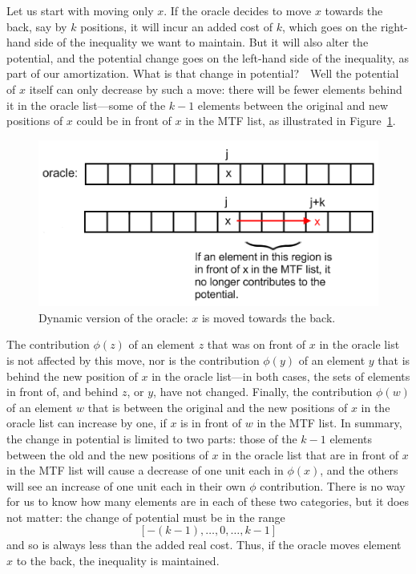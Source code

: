 \documentclass{article}
\begin{document}
Let us start with moving only $x$.  If the oracle decides to move $x$
towards the back, say by $k$ positions, it will incur an added cost of $k$,
which goes on the right-hand side of the inequality we want to maintain.
But it will also alter the potential, and the potential change goes on
the left-hand side of the inequality, as part of our amortization.
What is that change in potential?\ \ Well the potential of $x$ itself
can only decrease by such a move: there will be fewer elements behind it
in the oracle list---some of the $k-1$ elements between the original and
new positions of $x$ could be in front of $x$ in the MTF list,
as illustrated in Figure~\ref{fig:figure4}.
\begin{figure}[h!]%
  \centering
    \includegraphics[scale = 0.5]{figures/figure4.png}%
  \caption{Dynamic version of the oracle: $x$ is moved towards the back.}%
  \label{fig:figure4}%
\end{figure}%
The contribution $\phi(z)$ of an element $z$ that was on front of $x$ in
the oracle list is not affected by this move, nor is the contribution
$\phi(y)$ of an element $y$ that is behind the new position of $x$ in
the oracle list---in both cases, the sets of elements in front of,
and behind $z$, or $y$, have not changed.  Finally, the contribution $\phi(w)$
of an element $w$ that is between the original and the new positions
of $x$ in the oracle list can increase by one, if $x$ is in front
of $w$ in the MTF list.  In summary, the change in potential is limited
to two parts: those of the $k-1$ elements between the old and the new positions
of $x$ in the oracle list that are in front of $x$ in the MTF list
will cause a decrease of one unit each in $\phi(x)$, and the others
will see an increase of one unit each in their own $\phi$ contribution.
There is no way for us to know how many elements are in each of these
two categories, but it does not matter: the change of potential must be
in the range
  $$[-(k-1),\ldots,0,\ldots,k-1]$$
and so is always less than
the added real cost.  Thus, if the oracle moves element $x$ to the back,
the inequality is maintained.
\end{document}
